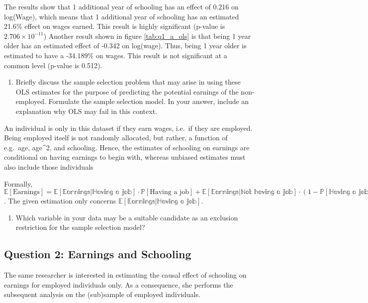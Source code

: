 \documentclass[
]{article}
\providecommand{\tightlist}{%
  \setlength{\itemsep}{0pt}\setlength{\parskip}{0pt}}
\begin{document}
The results show that 1 additional year of schooling has an effect of
0.216 on log(Wage), which means that 1 additional year of schooling has
an estimated 21.6\% effect on wages earned. This result is highly
significant (p-value is \ensuremath{2.706\times 10^{-11}}) Another
result shown in figure \ref{tab:q1_a_ols} is that being 1 year older has
an estimated effect of -0.342 on log(wage). Thus, being 1 year older is
estimated to have a -34.189\% on wages. This result is not significant
at a common level (p-value is 0.512).

\begin{enumerate}
\def\labelenumi{(\alph{enumi})}
\setcounter{enumi}{1}
\tightlist
\item
  Briefly discuss the sample selection problem that may arise in using
  these OLS estimates for the purpose of predicting the potential
  earnings of the non-employed. Formulate the sample selection model. In
  your answer, include an explanation why OLS may fail in this context.
\end{enumerate}

An individual is only in this dataset if they earn wages, i.e.~if they
are employed. Being employed itself is not randomly allocated, but
rather, a function of e.g.~age, age\^{}2, and schooling. Hence, the
estimates of schooling on earnings are conditional on having earnings to
begin with, whereas unbiased estimates must also include those
individuals

Formally,
\(\mathbb{E}[\text{Earnings}] = \mathbb{E[\text{Earnings}|\text{Having a job}]} \cdot \mathbb{P}[\text{Having a job}] + \mathbb{E[\text{Earnings}|\text{Not having a job}]} \cdot (1-\mathbb{P[\text{Having a job}]})\).
The given estimation only concerns
\(\mathbb{E[\text{Earnings}|\text{Having a job}]}\).

\begin{enumerate}
\def\labelenumi{(\alph{enumi})}
\setcounter{enumi}{2}
\tightlist
\item
  Which variable in your data may be a suitable candidate as an
  exclusion restriction for the sample selection model?
\end{enumerate}

\hypertarget{question-2-earnings-and-schooling}{%
\subsection{Question 2: Earnings and
Schooling}\label{question-2-earnings-and-schooling}}

The same researcher is interested in estimating the causal effect of
schooling on earnings for employed individuals only. As a consequence,
she performs the subsequent analysis on the (sub)sample of employed
individuals.
\end{document}
